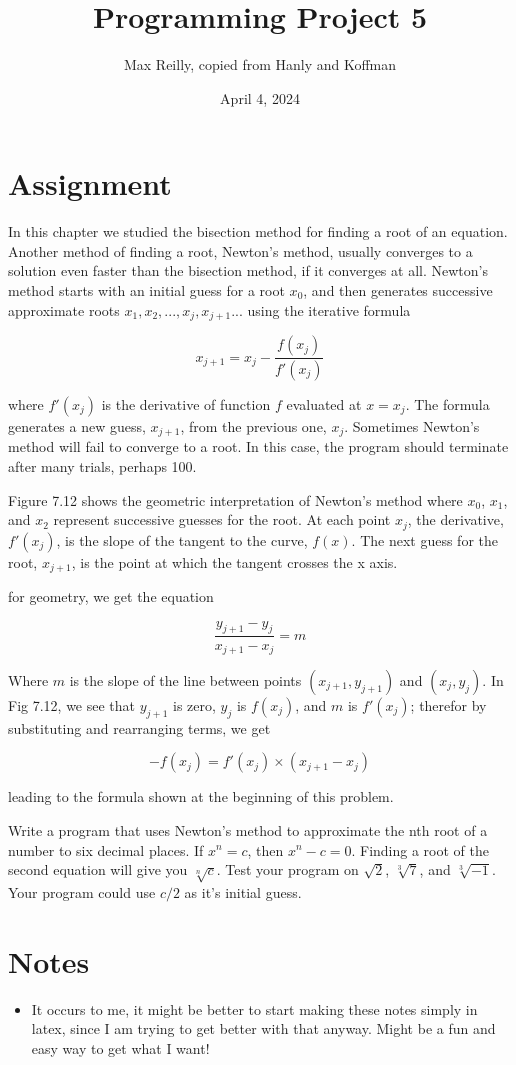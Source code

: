 \documentclass{article}
\title{Programming Project 5}
\author{Max Reilly, copied from Hanly and Koffman}
\date{April 4, 2024}
\begin{document}
\maketitle
\section{Assignment}
In this chapter we studied the bisection method for finding a root of an equation. Another method of
finding a root, Newton's method, usually converges to a solution even faster than the bisection
method, if it converges at all. Newton's method starts with an initial guess for a root $x_0$, and
then generates successive approximate roots $x_1, x_2, . . . , x_j, x_{j+1} . . .$ using the iterative
formula

$$
x_{j+1} = x_j - \frac{f(x_j)}{f'(x_j)}
$$

where $f'(x_j)$ is the derivative of function $f$ evaluated at $x = x_j$. The formula generates a new
guess, $x_{j+1}$, from the previous one, $x_{j}$. Sometimes Newton's method will fail to converge to
a root. In this case, the program should terminate after many trials, perhaps 100.

Figure 7.12 shows the geometric interpretation of Newton's method where $x_0$, $x_1$, and $x_2$
represent successive guesses for the root. At each point $x_j$, the derivative, $f'(x_j)$, is the
slope of the tangent to the curve, $f(x)$. The next guess for the root, $x_{j+1}$, is the point at
which the tangent crosses the x axis.

for geometry, we get the equation

$$
\frac{y_{j+1} - y_j}{x_{j+1} - x_j} = m
$$


Where $m$ is the slope of the line between points $(x_{j+1}, y_{j+1})$ and $(x_j, y_j)$. In Fig 7.12,
we see that $y_{j+1}$ is zero, $y_j$ is $f(x_j)$, and $m$ is $f'(x_j)$; therefor by substituting and
rearranging terms, we get

$$
-f(x_j) = f'(x_j) \times (x_{j+1} - x_j)
$$

leading to the formula shown at the beginning of this problem.

Write a program that uses Newton's method to approximate the nth root of a number to six decimal
places. If $x^n = c$, then $x^n -c = 0$. Finding a root of the second equation will give you
$\sqrt[n]{c}$. Test your program on $\sqrt{2}$, $\sqrt[3]{7}$, and $\sqrt[3]{-1}$. Your program could
use $c/2$ as it's initial guess.

\section{Notes}
\begin{itemize}
    \item It occurs to me, it might be better to start making these notes simply in latex, since I am
            trying to get better with that anyway. Might be a fun and easy way to get what I want!
\end{itemize}
\end{document}
